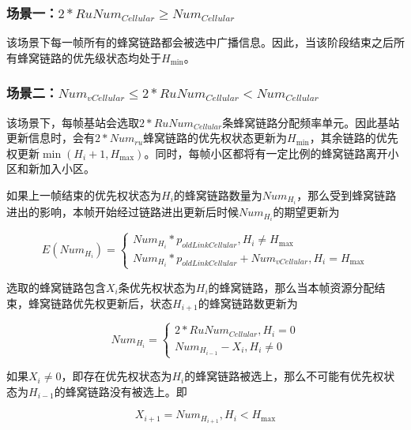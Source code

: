 \documentclass[figurelist,tablelist,algorithmlist,nomlist,masters]{seuthesix}
\begin{document}
	\subsubsection{场景一：$2*RuNu{m_{Cellular}} \ge Nu{m_{Cellular}}$}
	该场景下每一帧所有的蜂窝链路都会被选中广播信息。因此，当该阶段结束之后所有蜂窝链路的优先级状态均处于${H_{\min }}$。
	
	\subsubsection{场景二：$Nu{m_{vCellular}} \le 2*RuNu{m_{Cellular}} < Nu{m_{Cellular}}$}
	该场景下，每帧基站会选取$2*RuNu{m_{Cellular}}$条蜂窝链路分配频率单元。因此基站更新信息时，会有$2*Nu{m_{ru}}$蜂窝链路的优先权状态更新为${H_{\min }}$，其余链路的优先权更新$\min ({H_i} + 1,{H_{\max }})$。同时，每帧小区都将有一定比例的蜂窝链路离开小区和新加入小区。
	
	如果上一帧结束的优先权状态为${H_i}$的蜂窝链路数量为$Nu{m_{{H_i}}}$，那么受到蜂窝链路进出的影响，本帧开始经过链路进出更新后时候$Nu{m_{{H_i}}}$的期望更新为
	
	\begin{equation}\label{eq3.1}
	E(Nu{m_{{H_i}}}) = \left\{ \begin{array}{l}
	Nu{m_{{H_i}}}*{p_{oldLinkCellular}},{H_i} \ne {H_{\max }}\\
	Nu{m_{{H_i}}}*{p_{oldLinkCellular}} + Nu{m_{vCellular}},{H_i} = {H_{\max }}
	\end{array} \right.
	\end{equation}
	
	选取的蜂窝链路包含${X_i}$条优先权状态为${H_i}$的蜂窝链路，那么当本帧资源分配结束，蜂窝链路优先权更新后，状态${H_{i + 1}}$的蜂窝链路数更新为
	
	\begin{equation}\label{eq3.1}
	Nu{m_{{H_i}}} = \left\{ \begin{array}{l}
	2*RuNu{m_{Cellular}},{H_i} = 0\\
	Nu{m_{{H_{i - 1}}}} - {X_i},{H_i} \ne 0
	\end{array} \right.
	\end{equation}
	
	如果${X_i} \ne 0$，即存在优先权状态为${H_i}$的蜂窝链路被选上，那么不可能有优先权状态为${H_{i - 1}}$的蜂窝链路没有被选上。即
	
	\begin{equation}\label{eq3.1}
	{X_{i + 1}} = Nu{m_{{H_{i + 1}}}},{H_i} < {H_{\max }}
	\end{equation}
	
\end{document}
